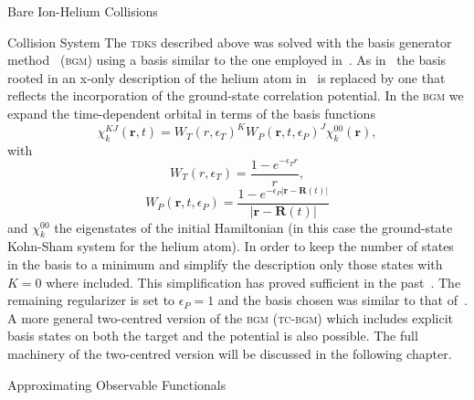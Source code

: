 \documentclass[letterpaper, 11 pt]{report}
\begin{document}
\begin{chapter}{Bare Ion-Helium Collisions \label{chap:p-he2p-he}}
\begin{section}{Collision System \label{sec:p-he2p-he-sys}}
      The \textsc{tdks} described above was solved with the basis generator method~\cite{bgm}
      (\textsc{bgm}) using a basis similar to the one employed in~\cite{keim-ihe}. As in~\cite{pbarhe}
      the basis rooted in an x-only description of the helium atom in~\cite{keim-ihe} is replaced by one
      that reflects the incorporation of the ground-state correlation potential. In the \textsc{bgm} we
      expand the time-dependent orbital in terms of the basis functions
      \begin{equation} \label{eq:bgmbasis}
         \chi^{KJ}_k (\mathbf{r},t)
         = W_T(r,\epsilon_T)^K W_P( \mathbf{r},t, \epsilon_P)^J \chi^{00}_k (\mathbf{r}),
      \end{equation}
      with
      \begin{equation}
         W_T(r,\epsilon_T) = \frac{1 - e^{-\epsilon_T r}}{r},
      \end{equation}
      \begin{equation}
         W_P (\mathbf{r},t,\epsilon_P)
         = \frac{1 - e^{-\epsilon_P|\mathbf{r} - \mathbf{R}(t)|}}{|\mathbf{r} - \mathbf{R}(t)|}
      \end{equation}
      and $\chi^{00}_k$ the eigenstates of the initial Hamiltonian (in this case the ground-state
      Kohn-Sham system for the helium atom). In order to keep the number of states in the basis to a
      minimum and simplify the description only those states with $K = 0$ where included. This
      simplification has proved sufficient in the past~\cite{bgm-rev}. The remaining regularizer is set
      to $\epsilon_P = 1$ and the basis chosen was similar to that of~\cite{keim-ihe}. A more general
      two-centred version of the \textsc{bgm} (\textsc{tc-bgm}) which includes explicit basis states on
      both the target and the potential is also possible. The full machinery of the two-centred version
      will be
      discussed in the following chapter.

   \end{section}

   \begin{section}{Approximating Observable Functionals \label{sec:phe2p-obs}}


\end{section}
\end{chapter}
\end{document}
